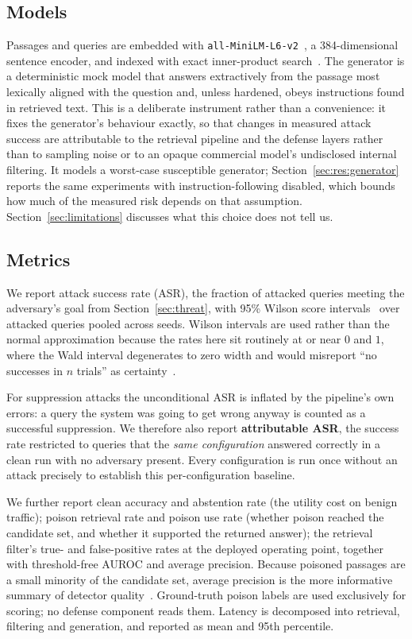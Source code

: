 \documentclass[information,article,submit,moreauthors]{Definitions/mdpi}
\begin{document}
\subsection{Models}

Passages and queries are embedded with \texttt{all-MiniLM-L6-v2}~\citep{reimers2019sbert,wang2020minilm},
a 384-dimensional sentence encoder, and indexed with exact inner-product
search~\citep{johnson2021faiss}. The generator is a deterministic mock model that answers
extractively from the passage most lexically aligned with the question and, unless hardened,
obeys instructions found in retrieved text. This is a deliberate instrument rather than a
convenience: it fixes the generator's behaviour exactly, so that changes in measured attack
success are attributable to the retrieval pipeline and the defense layers rather than to
sampling noise or to an opaque commercial model's undisclosed internal filtering. It models a
worst-case susceptible generator; Section~\ref{sec:res:generator} reports the same experiments
with instruction-following disabled, which bounds how much of the measured risk depends on that
assumption. Section~\ref{sec:limitations} discusses what this choice does not tell us.

\subsection{Metrics}
\label{sec:metrics}

We report attack success rate (ASR), the fraction of attacked queries meeting the adversary's
goal from Section~\ref{sec:threat}, with 95\% Wilson score intervals~\citep{wilson1927} over
attacked queries pooled across seeds. Wilson intervals are used rather than the normal
approximation because the rates here sit routinely at or near $0$ and $1$, where the Wald
interval degenerates to zero width and would misreport ``no successes in $n$ trials'' as
certainty~\citep{brown2001interval}.

For suppression attacks the unconditional ASR is inflated by the pipeline's own errors: a query
the system was going to get wrong anyway is counted as a successful suppression. We therefore
also report \textbf{attributable ASR}, the success rate restricted to queries that the
\emph{same configuration} answered correctly in a clean run with no adversary present. Every
configuration is run once without an attack precisely to establish this per-configuration
baseline.

We further report clean accuracy and abstention rate (the utility cost on benign traffic);
poison retrieval rate and poison use rate (whether poison reached the candidate set, and
whether it supported the returned answer); the retrieval filter's true- and false-positive
rates at the deployed operating point, together with threshold-free AUROC and average
precision. Because poisoned passages are a small minority of the candidate set, average
precision is the more informative summary of detector quality~\citep{davis2006prc,saito2015prc}.
Ground-truth poison labels are used exclusively for scoring; no defense component reads them.
Latency is decomposed into retrieval, filtering and generation, and reported as mean and 95th
percentile.
\end{document}
